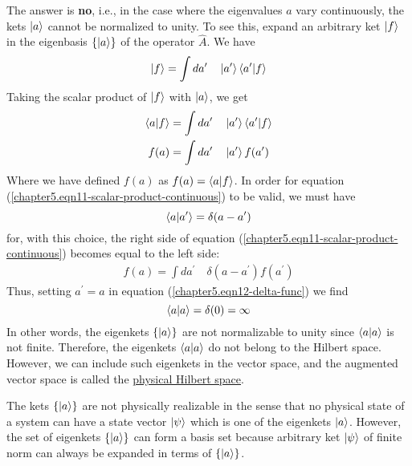 		
		The answer is \textbf{no}, i.e., in the case where the eigenvalues $a$ vary continuously, the kets $\ket{a}$ cannot be normalized to unity. To see this, expand an arbitrary ket $\ket{f}$ in the eigenbasis $\{\ket{a}\}$ of the operator $\hat{A}$. We have
		\begin{equation}
			\ket{f} = \int da^\prime \quad \ket{a^\prime}\braket{a^\prime}{f}
			\label{chapter5.eqn10-expansion-continuous}
		\end{equation}
		Taking the scalar product of $\ket{f}$ with $\ket{a}$, we get
		\begin{eqnarray}
		\braket{a}{f} 
		&= \int da^\prime \quad \ket{a^\prime}\braket{a^\prime}{f} \nonumber \\
		f(a) &= \int da^\prime \quad \ket{a^\prime}f(a^\prime)
		\label{chapter5.eqn11-scalar-product-continuous}
		\end{eqnarray}
		Where we have defined $f(a)$ as $f(a) = \braket{a}{f}$. In order for equation (\ref{chapter5.eqn11-scalar-product-continuous}) to be valid, we must have
		\begin{equation}
			\braket{a}{a^\prime} = \delta(a-a^\prime)
			\label{chapter5.eqn12-delta-func}
		\end{equation}
		for, with this choice, the right side of equation (\ref{chapter5.eqn11-scalar-product-continuous}) becomes equal to the left side:
		\begin{eqnarray}
			f(a) = \int da^\prime \quad \delta(a-a^\prime) f(a^\prime)
		\end{eqnarray}
		Thus, setting $a^\prime = a$ in equation (\ref{chapter5.eqn12-delta-func}) we find
		\begin{equation}
			\braket{a}{a} = \delta(0) = \infty
		\end{equation}
		In other words, the eigenkets $\{\ket{a}\}$ are not normalizable to unity since $\braket{a}{a}$ is not finite. Therefore, the eigenkets $\braket{a}{a}$ do not belong to the Hilbert space. However, we can include such eigenkets in the vector space, and the augmented vector space is called the \underline{physical Hilbert space}.
		
		
		
		The kets $\{\ket{a}\}$  are not physically realizable in the sense that no physical state of a system can have a state vector $\ket{\psi}$ which is one of the eigenkets $\ket{a}$. However, the set of eigenkets $\{\ket{a}\}$ can form a basis set because arbitrary ket $\ket{\psi}$ of finite norm can always be expanded in terms of $\{\ket{a}\}$.
		
